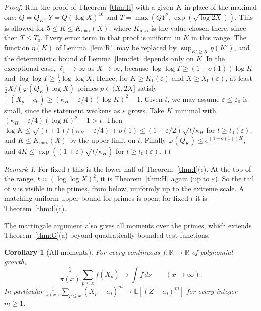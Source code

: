 \documentclass[11pt]{amsart}
\newtheorem{corollary}[lemma]{Corollary}
\theoremstyle{remark}
\newtheorem{remark}[lemma]{Remark}
\newcommand{\E}{\mathbb{E}}
\begin{document}
\begin{proof}
Run the proof of Theorem~\ref{thm:H} with a given $K$ in place of the maximal one: $Q=Q_K$, $Y=Q(\log X)^{16}$ and $T=\max(QY^2,\exp(\sqrt{\log2X}))$. This is allowed for $5\le K\le K_{\max}(X)$, where $K_{\max}$ is the value chosen there, since then $T\le T_0$. Every error term in that proof is uniform in $K$ in this range. The function $\eta(K)$ of Lemma~\ref{lem:R'} may be replaced by $\sup_{K'\ge K}\eta(K')$, and the deterministic bound of Lemma~\ref{lem:det} depends only on $K$. In the exceptional case, $\ell_1\to\infty$ as $X\to\infty$, because $\log\log T\ge(1+o(1))\log K$ and $\log\log T\ge\frac12\log\log X$. Hence, for $K\ge K_1(\varepsilon)$ and $X\ge X_0(\varepsilon)$, at least $\frac12X/(\varphi(Q_K)\log X)$ primes $p\in(X,2X]$ satisfy $\pm(X_p-c_0)\ge(\kappa_H-\varepsilon/4)(\log K)^2-1$. Given $t$, we may assume $\varepsilon\le\varepsilon_0$ is small, since the statement weakens as $\varepsilon$ grows. Take $K$ minimal with $(\kappa_H-\varepsilon/4)(\log K)^2-1>t$. Then $\log K\le\sqrt{(t+1)/(\kappa_H-\varepsilon/4)}+o(1)\le(1+\varepsilon/2)\sqrt{t/\kappa_H}$ for $t\ge t_0(\varepsilon)$, and $K\le K_{\max}(X)$ by the upper limit on $t$. Finally $\varphi(Q_K)\le e^{(4+o(1))K}$, and $4K\le\exp((1+\varepsilon)\sqrt{t/\kappa_H})$ for $t\ge t_0(\varepsilon)$.
\end{proof}

\begin{remark}
For fixed $t$ this is the lower half of Theorem~\ref{thm:I}(c). At the top of the range, $t\asymp(\log\log X)^2$, it is Theorem~\ref{thm:H} again (up to $\varepsilon$). So the tail of $\nu$ is visible in the primes, from below, uniformly up to the extreme scale. A matching uniform upper bound for primes is open; for fixed $t$ it is Theorem~\ref{thm:I}(c).
\end{remark}

The martingale argument also gives all moments over the primes, which extends Theorem~\ref{thm:G}(a) beyond quadratically bounded test functions.

\begin{corollary}[All moments]\label{cor:moments}
For every continuous $f:\mathbb R\to\mathbb R$ of polynomial growth,
\[
\frac1{\pi(x)}\sum_{p\le x}f(X_p)\to\int f\,d\nu\qquad(x\to\infty).
\]
In particular $\frac1{\pi(x)}\sum_{p\le x}(X_p-c_0)^m\to\E[(Z-c_0)^m]$ for every integer $m\ge1$.
\end{corollary}
\end{document}
